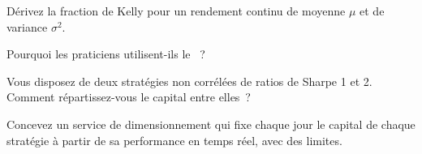 \begin{interviewq}\label{iq:m2:thinking-in-expected-value:3}
Dérivez la fraction de Kelly pour un rendement continu de moyenne $\mu$ et de variance $\sigma^2$.
\end{interviewq}

\begin{interviewq}\label{iq:m2:thinking-in-expected-value:4}
Pourquoi les praticiens utilisent-ils le ~?
\end{interviewq}

\begin{interviewq}\label{iq:m2:thinking-in-expected-value:5}
Vous disposez de deux stratégies non corrélées de ratios de Sharpe 1 et 2. Comment répartissez-vous le
capital entre elles~?
\end{interviewq}

\begin{interviewq}\label{iq:m2:thinking-in-expected-value:6}
Concevez un service de dimensionnement qui fixe chaque jour le capital de chaque stratégie à partir de sa
performance en temps réel, avec des limites.
\end{interviewq}
